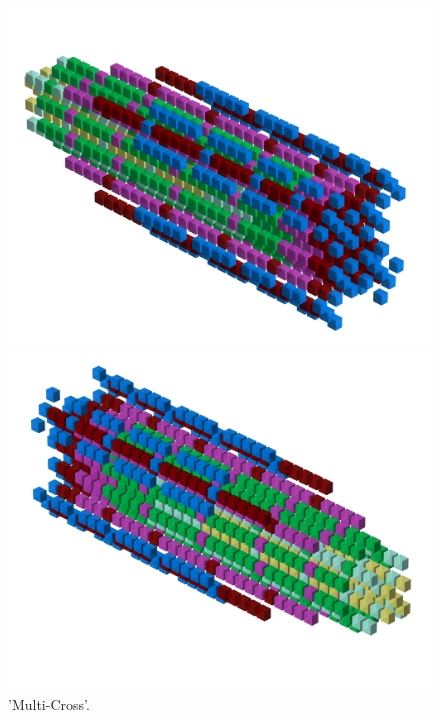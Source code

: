 \begin{minipage}[b]{0.48\linewidth}
\begin{figure}[H]
    \centering
    \begin{adjustbox}{width=6cm,margin=0cm 0cm}
      \includegraphics[width=12cm]{src/patterns/pattern6-45.png}%
    \end{adjustbox}
    \begin{adjustbox}{width=6cm,margin=0cm -1.8cm}
      \includegraphics[width=12cm]{src/patterns/pattern6-225.png}%
    \end{adjustbox}
\caption{'Multi-Cross'.}
\end{figure}
\end{minipage}
